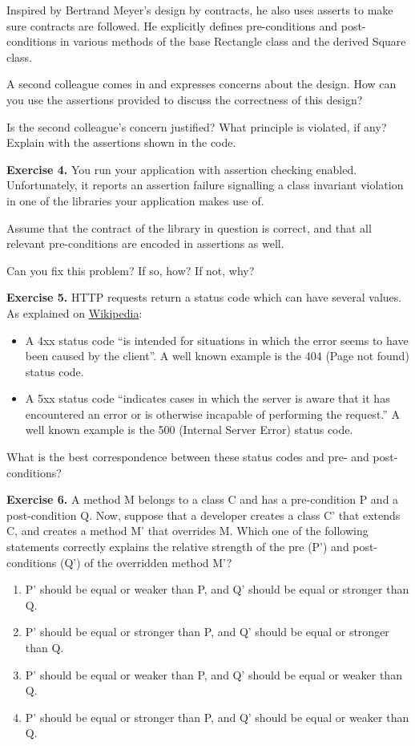 Inspired by Bertrand Meyer's design by contracts, he also uses asserts
to make sure contracts are followed. He explicitly defines
pre-conditions and post-conditions in various methods of the base
Rectangle class and the derived Square class.

A second colleague comes in and expresses concerns about the design. How
can you use the assertions provided to discuss the correctness of this
design?

Is the second colleague's concern justified? What principle is violated,
if any? Explain with the assertions shown in the code.

\textbf{Exercise 4.} You run your application with assertion checking
enabled. Unfortunately, it reports an assertion failure signalling a
class invariant violation in one of the libraries your application makes
use of.

Assume that the contract of the library in question is correct, and that
all relevant pre-conditions are encoded in assertions as well.

Can you fix this problem? If so, how? If not, why?

\textbf{Exercise 5.} HTTP requests return a status code which can have
several values. As explained on
\href{https://en.wikipedia.org/wiki/List_of_HTTP_status_codes}{Wikipedia}:

\begin{itemize}
\tightlist
\item
  A 4xx status code ``is intended for situations in which the error
  seems to have been caused by the client''. A well known example is the
  404 (Page not found) status code.
\item
  A 5xx status code ``indicates cases in which the server is aware that
  it has encountered an error or is otherwise incapable of performing
  the request.'' A well known example is the 500 (Internal Server Error)
  status code.
\end{itemize}

What is the best correspondence between these status codes and pre- and
post-conditions?

\textbf{Exercise 6.} A method M belongs to a class C and has a
pre-condition P and a post-condition Q. Now, suppose that a developer
creates a class C' that extends C, and creates a method M' that
overrides M. Which one of the following statements correctly explains
the relative strength of the pre (P') and post-conditions (Q') of the
overridden method M'?

\begin{enumerate}
\def\labelenumi{\arabic{enumi}.}
\tightlist
\item
  P' should be equal or weaker than P, and Q' should be equal or
  stronger than Q.
\item
  P' should be equal or stronger than P, and Q' should be equal or
  stronger than Q.
\item
  P' should be equal or weaker than P, and Q' should be equal or weaker
  than Q.
\item
  P' should be equal or stronger than P, and Q' should be equal or
  weaker than Q.
\end{enumerate}

